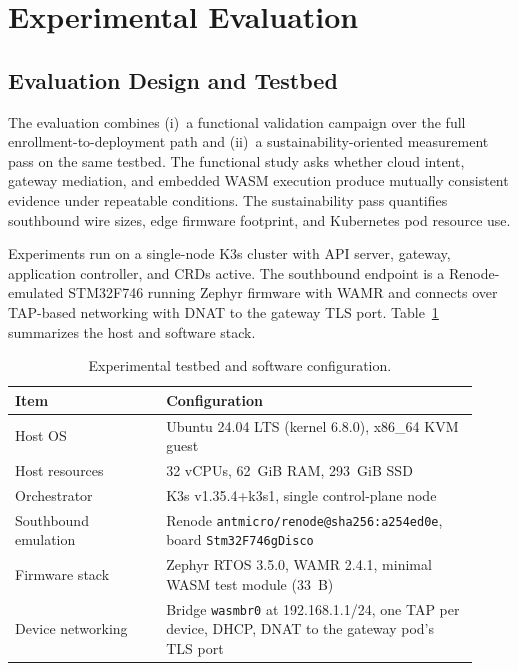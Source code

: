 \section{Experimental Evaluation}\label{sec:evaluation}

\subsection{Evaluation Design and Testbed}
{\color{red}The evaluation combines (i)~a functional validation campaign over the full enrollment-to-deployment path and (ii)~a sustainability-oriented measurement pass on the same testbed.} The functional study asks whether cloud intent, gateway mediation, and embedded WASM execution produce mutually consistent evidence under repeatable conditions. The sustainability pass quantifies southbound wire sizes, edge firmware footprint, and Kubernetes pod resource use. 

Experiments run on a single-node K3s cluster with API server, gateway, application controller, and CRDs active. The southbound endpoint is a Renode-emulated STM32F746 running Zephyr firmware with WAMR and connects over TAP-based networking with DNAT to the gateway TLS port. Table~\ref{tab:testbed} summarizes the host and software stack.

\begin{table}[pos=t]
\centering
\caption{Experimental testbed and software configuration.}%
\label{tab:testbed}
\footnotesize
\setlength{\tabcolsep}{3pt}
\begin{tabular}{p{0.30\linewidth} p{0.62\linewidth}}
\toprule
\textbf{Item} & \textbf{Configuration} \\
\midrule
Host OS & Ubuntu 24.04 LTS (kernel 6.8.0), x86\_64 KVM guest \\
Host resources & 32 vCPUs, 62~GiB RAM, 293~GiB SSD \\
Orchestrator & K3s v1.35.4+k3s1, single control-plane node \\
Southbound emulation & Renode \texttt{antmicro/renode@sha256:a254ed0e}, board \texttt{Stm32F746gDisco} \\
Firmware stack & Zephyr RTOS 3.5.0, WAMR 2.4.1, minimal WASM test module (33~B) \\
Device networking & Bridge \texttt{wasmbr0} at 192.168.1.1/24, one TAP per device, DHCP, DNAT to the gateway pod's TLS port \\
\bottomrule
\end{tabular}
\end{table}

